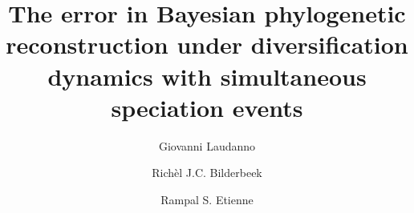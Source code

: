 \usepackage{authblk}
\title{The error in Bayesian phylogenetic reconstruction under diversification dynamics with simultaneous speciation events}

\author[1]{Giovanni Laudanno}
\author[1]{Rich\`el J.C. Bilderbeek}
\author[1]{Rampal S. Etienne}
